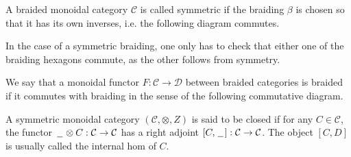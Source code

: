 \documentclass[../thesis.tex]{subfiles}
\begin{document}
        \begin{definition}
            A braided monoidal category $\mathcal{C}$ is called symmetric if the braiding $\beta$ is chosen so that it has its own inverses, i.e. the following diagram commutes.
            \begin{center}
            \end{center}
        \end{definition}

        In the case of a symmetric braiding, one only has to check that either one of the braiding hexagons commute, as the other follows from symmetry.

        \begin{definition}
            We say that a monoidal functor $F : \mathcal{C} \rightarrow \mathcal{D}$ between braided categories is braided if it commutes with braiding in the sense of the following commutative diagram.
            \begin{center}
            \end{center}
        \end{definition}

        \begin{definition}
            A symmetric monoidal category $(\mathcal{C}, \otimes, Z)$ is said to be closed if for any $C \in \mathcal{C}$, the functor $\hspace{0.05cm}\underline{\hspace{0.2cm}}\hspace{0.05cm} \otimes C : \mathcal{C} \rightarrow \mathcal{C}$ has a right adjoint $[C, \hspace{0.05cm}\underline{\hspace{0.2cm}}\hspace{0.05cm}] : \mathcal{C} \rightarrow \mathcal{C}$. The object $[C, D]$ is usually called the internal hom of $C$.
        \end{definition}
\end{document}

